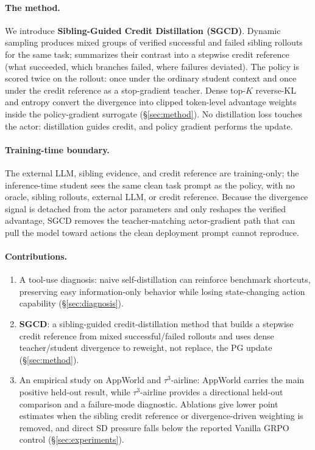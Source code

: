 \paragraph{The method.} We introduce \textbf{Sibling-Guided Credit Distillation
(SGCD)}. Dynamic sampling produces mixed groups of verified successful and failed
sibling rollouts for the same task; \creditreferenceproviderphrase{} summarizes their
contrast into a stepwise credit reference (what succeeded, which branches failed,
where failures deviated). The policy is scored twice on the rollout: once under
the ordinary student context and once under the credit reference as a stop-gradient
teacher. Dense top-$K$ reverse-KL and entropy convert the divergence into
clipped token-level advantage weights inside the policy-gradient surrogate
(\S\ref{sec:method}). No distillation loss touches the actor: distillation guides
credit, and policy gradient performs the update.

\paragraph{Training-time boundary.} The external LLM, sibling evidence, and
credit reference are training-only; the inference-time student sees the same clean
task prompt as the policy, with no oracle, sibling rollouts, external LLM, or credit
reference. Because the divergence signal is detached from the actor parameters
and only reshapes the verified advantage, SGCD removes the teacher-matching
actor-gradient path that can pull the model toward actions the clean deployment
prompt cannot reproduce.

\paragraph{Contributions.}
\begin{enumerate}
  \item A tool-use diagnosis: naive self-distillation can reinforce benchmark
    shortcuts, preserving easy information-only behavior while losing
    state-changing action capability (\S\ref{sec:diagnosis}).
  \item \textbf{SGCD}: a sibling-guided credit-distillation method that builds a
    stepwise credit reference from mixed successful/failed rollouts and uses
    dense teacher/student divergence to reweight, not replace, the PG update
    (\S\ref{sec:method}).
  \item An empirical study on AppWorld and $\tau^3$-airline: AppWorld carries the
    main positive held-out result, while $\tau^3$-airline provides a directional
    held-out comparison and a failure-mode diagnostic. Ablations give lower
    point estimates when the sibling credit reference or divergence-driven
    weighting is removed, and direct SD pressure falls below the reported Vanilla
    GRPO control (\S\ref{sec:experiments}).
\end{enumerate}
